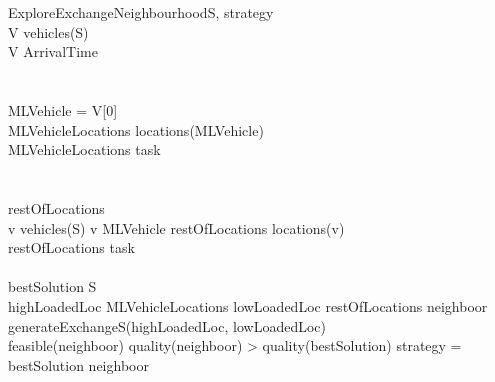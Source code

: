 \documentclass[]{report}
\begin{document}
\begin{pseudocode}{ExploreExchangeNeighbourhood}{S, strategy}
	\label{pc:exchange_neighbourhood}
	\\
	V \GETS vehicles(S)\\
	 V  ArrivalTime \\
	\\
	\\
	MLVehicle = V[0]\\
	MLVehicleLocations \GETS locations(MLVehicle)\\
	 MLVehicleLocations  task \\
	\\
	\\
	restOfLocations \GETS \varnothing\\
	\FOREACH v \in vehicles(S) \DO
		\IF v \neq MLVehicle \THEN
			restOfLocations \GETS locations(v)\\
	 restOfLocations  task \\
	\\
	bestSolution \GETS S\\
	\FOREACH highLoadedLoc \in MLVehicleLocations \DO
	\BEGIN
		\FOREACH lowLoadedLoc \in restOfLocations \DO
		\BEGIN
			neighboor \GETS generateExchangeS(highLoadedLoc, lowLoadedLoc)\\
			\IF feasible(neighboor) \AND quality(neighboor) > quality(bestSolution) \THEN
			\BEGIN
				\IF strategy =  \THEN
				\ELSE
					bestSolution \GETS neighboor\\
			\END
		\END
	\END\\
	
	
	
	
\end{pseudocode}
\end{document}

